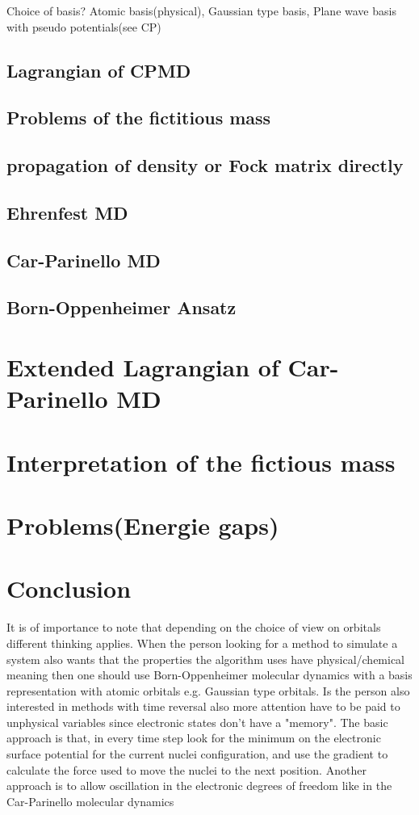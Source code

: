 \documentclass[12pt]{scrartcl}
\begin{document}
Choice of basis? Atomic basis(physical), Gaussian type basis, Plane wave basis with pseudo potentials(see CP)

\subsection{Lagrangian of CPMD}
\subsection{Problems of the fictitious mass}

\subsection{propagation of density or Fock matrix directly}




\subsection{Ehrenfest MD}
\subsection{Car-Parinello MD}
\subsection{Born-Oppenheimer Ansatz}

\section{Extended Lagrangian of Car-Parinello MD}
\section{Interpretation of the fictious mass}
\section{Problems(Energie gaps)}
\section{Conclusion}
It is of importance to note that depending on the choice of view on orbitals different thinking applies. When the person looking for a method to simulate a system also wants that the properties the algorithm uses have physical/chemical meaning then one should use Born-Oppenheimer molecular dynamics with a basis representation with atomic orbitals e.g. Gaussian type orbitals. Is the person also interested in methods with time reversal also more attention have to be paid to unphysical variables since electronic states don't have a "memory". The basic approach is that, in every time step look for the minimum on the electronic surface potential for the current nuclei configuration, and use the gradient to calculate the force used to move the nuclei to the next position. Another approach is to allow oscillation in the electronic degrees of freedom like in the Car-Parinello molecular dynamics 
\end{document}
